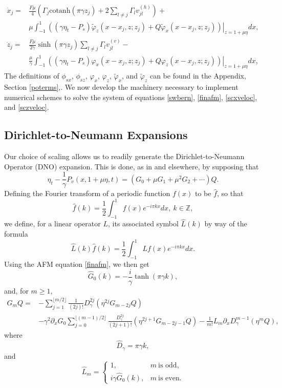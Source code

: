 \documentclass[a4paper,11pt]{article}
\newcommand{\ba}{\begin{array}}
\newcommand{\ea}{\end{array}}
\newcommand{\p}{\partial}
\begin{document}
\begin{align}
\dot{x}_{j} = &\frac{F\mu}{4}\left(\Gamma_{j}\mbox{cotanh}\left(\pi \gamma z_{j} \right)+2\sum_{l\neq j}\Gamma_{l}v_{jl}^{(h)} \right)+\label{scxveloc}\\
& \mu \int_{-1}^{1} \left.\left( \left(\gamma \eta_{t}-P_{s} \right) \tilde{\varphi}_{z}(x-x_{j},z;z_{j}) +  Q \tilde{\varphi}_{x}(x-x_{j},z;z_{j}) \right)\right|_{z=1+\mu\eta} dx, \nonumber\\
\dot{z}_{j} = & \frac{F\mu}{2\gamma}\sinh\left( \pi \gamma z_{j}\right)\sum_{l\neq j} \Gamma_{l} v_{jl}^{(v)}-\label{sczveloc}\\
&  \frac{\mu}{\gamma }\int_{-1}^{1} \left.\left(\left(\gamma \eta_{t}-P_{s}\right) \varphi_{x}(x-x_{j},z;z_{j}) + Q \varphi_{z}(x-x_{j},z;z_{j}) \right)\right|_{z=1+\mu\eta}dx, \nonumber
\end{align}
The definitions of $\phi_{sx}$, $\phi_{sz}$, $\varphi_{x}$, $\varphi_{z}$, $\tilde{\varphi}_{x}$, and $\tilde{\varphi}_{z}$ can be found in the Appendix, Section \ref{poterms},.  We now develop the machinery necessary to implement numerical schemes to solve the system of equations \eqref{swbern}, \eqref{finafm}, \eqref{scxveloc}, and \eqref{sczveloc}.  
\subsection{Dirichlet-to-Neumann Expansions}
Our choice of scaling allows us to readily generate the Dirichlet-to-Neumann Operator (DNO) expansion.  This is done, as in \cite{craig} and elsewhere, by supposing that 
\[
\eta_{t} - \frac{1}{\gamma}P_{v}(x,1+\mu \eta,t) = \left(G_{0} + \mu G_{1} + \mu^{2}  G_{2} + \cdots \right)Q.
\]
Defining the Fourier transform of a periodic function $f(x)$ to be $\hat{f}$, so that 
\[
\hat{f}(k) = \frac{1}{2}\int_{-1}^{1}f(x)e^{-i\pi k x} dx, ~ k\in \mathbb{Z},
\]
we define, for a linear operator $L$, its associated symbol $\hat{L}(k)$ by way of the formula 
\[
\hat{L}(k)\hat{f}(k) = \frac{1}{2}\int_{-1}^{1} Lf(x) e^{-i\pi k x}dx.
\]
Using the AFM equation \eqref{finafm}, we then get 
\[
\hat{G}_{0}(k) = -\frac{i}{\gamma}\tanh(\pi \gamma k),
\]
and, for $m\geq 1$, 
\begin{align*}
G_{m}Q = & -\sum_{j=1}^{\lfloor{m/2}\rfloor}\frac{1}{(2j)!}D^{2j}_{\gamma}\left(\eta^{2j}G_{m-2j}Q\right) \\
& - \gamma^{2}\p_{x}G_{0} \sum_{j=0}^{\lfloor{(m-1)/2}\rfloor}\frac{D_{\gamma}^{2j}}{(2j+1)!}\left(\eta^{2j+1}G_{m-2j-1}Q\right) - \frac{1}{m!}L_{m} \p_{x}D_{\gamma}^{m-1}\left(\eta^{m}Q \right),
\end{align*}
where
\[
\hat{D}_{\gamma} = \pi \gamma k,
\]
and
\[
\hat{L}_{m} = \left\{
\ba{rl}
1,  & m~\mbox{is odd}, \\
i\gamma \hat{G}_{0}(k),  & m~\mbox{is even}.
\ea
\right.
\]
\end{document}
